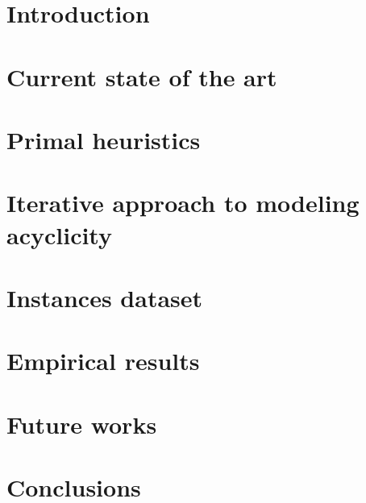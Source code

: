 \documentclass[a4paper,twoside,12pt]{report}
\newcommand\blankpage{%
    \null
    \thispagestyle{empty}%
    \addtocounter{page}{-1}%
    \newpage}
\begin{document}
\afterpage{\blankpage}

\clearpage{\pagestyle{plain}\cleardoublepage}
\tableofcontents

\clearpage{\pagestyle{plain}\cleardoublepage}

\clearpage{\pagestyle{plain}\cleardoublepage}
\chapter{Introduction}


\clearpage{\pagestyle{plain}\cleardoublepage}
\chapter{Current state of the art}


\clearpage{\pagestyle{plain}\cleardoublepage}
\chapter{Primal heuristics}


\clearpage{\pagestyle{plain}\cleardoublepage}
\chapter{Iterative approach to modeling acyclicity}


\clearpage{\pagestyle{plain}\cleardoublepage}
\chapter{Instances dataset}


\clearpage{\pagestyle{plain}\cleardoublepage}
\chapter{Empirical results}


\clearpage{\pagestyle{plain}\cleardoublepage}
\chapter{Future works}


\clearpage{\pagestyle{plain}\cleardoublepage}
\chapter{Conclusions}


\afterpage{\blankpage}
    
\printbibliography
\end{document}

